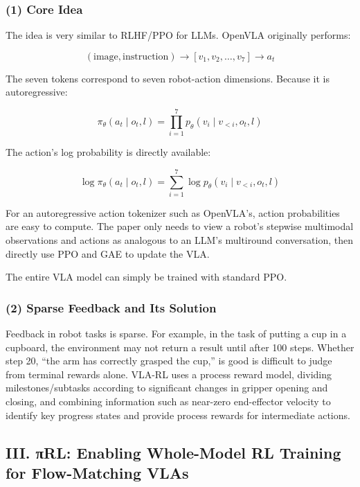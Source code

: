 \hypertarget{core-idea-2}{%
\subsubsection{(1) Core Idea}\label{core-idea-2}}

The idea is very similar to RLHF/PPO for LLMs. OpenVLA originally performs:

\[
(\text{image},\text{instruction})
\longrightarrow
[v_1,v_2,\ldots,v_7]
\longrightarrow
a_t
\]

The seven tokens correspond to seven robot-action dimensions. Because it is autoregressive:

\[
\pi_\theta(a_t\mid o_t,l)=\prod_{i=1}^{7}p_\theta(v_i\mid v_{<i},o_t,l)
\]

The action's log probability is directly available:

\[
\log\pi_\theta(a_t\mid o_t,l)=\sum_{i=1}^{7}\log p_\theta(v_i\mid v_{<i},o_t,l)
\]

For an autoregressive action tokenizer such as OpenVLA's, action probabilities are easy to compute. The paper only needs to view a robot's stepwise multimodal observations and actions as analogous to an LLM's multiround conversation, then directly use PPO and GAE to update the VLA.

The entire VLA model can simply be trained with standard PPO.

\hypertarget{sparse-feedback-and-its-solution}{%
\subsubsection{(2) Sparse Feedback and Its Solution}\label{sparse-feedback-and-its-solution}}

Feedback in robot tasks is sparse. For example, in the task of putting a cup in a cupboard, the environment may not return a result until after 100 steps. Whether step 20, ``the arm has correctly grasped the cup,'' is good is difficult to judge from terminal rewards alone. VLA-RL uses a process reward model, dividing milestones/subtasks according to significant changes in gripper opening and closing, and combining information such as near-zero end-effector velocity to identify key progress states and provide process rewards for intermediate actions.

\hypertarget{iii.-ux3c0rl-enabling-whole-model-rl-training-for-flow-matching-vlas}{%
\subsection{III. πRL: Enabling Whole-Model RL Training for Flow-Matching VLAs}\label{iii.-ux3c0rl-enabling-whole-model-rl-training-for-flow-matching-vlas}}

